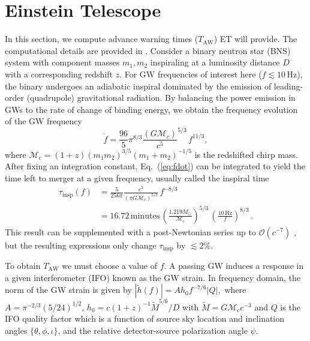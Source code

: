 \documentclass{aa}
\newcommand{\be}{\begin{equation}}
\newcommand{\ee}{\end{equation}}
\newcommand{\f}{\frac}
\newcommand{\nn}{\nonumber}
\newcommand{\ord}{\mathcal{O}}
\newcommand{\M}{\mathcal{M}_c}
\begin{document}
\section{Einstein Telescope}
\label{sect:et}
In this section, we compute advance warning times ($T_\text{AW}$) ET will provide.
The computational details are provided in \cite{Akcay18}.
Consider a binary neutron star (BNS) system with component masses
$m_1, m_2$ inspiraling at a luminosity distance $D$ with a corresponding redshift $z$. For GW frequencies of interest here ($f \lesssim 10\,$Hz), the binary undergoes an adiabatic inspiral dominated by
the emission of leading-order (quadrupole)
gravitational radiation. By balancing the
power emission in GWs to the rate of change of binding energy, we obtain the frequency evolution of the GW frequency
%
\be
\dot{f} = \f{96}{5}\pi^{8/3} \f{(G \mathcal{M}_c)}{c^5}^{5/3}\, f^{11/3}, \label{eq:fdot}
\ee
where $\mathcal{M}_c  = (1+z){(m_1 m_2)^{3/5}}{(m_1+m_2)^{-1/5}}$ is the redshifted chirp mass. 
After fixing an integration constant, Eq.~(\ref{eq:fdot})
can be integrated to yield the time left to merger at a given frequency, usually called the inspiral time
%
\begin{align}
\tau_\text{insp}(f) &= \f{5}{256\pi}\f{c^5}{(\pi G \M)^{5/3}} \,f^{-8/3}\nn\\
&=16.72\,\text{minutes} \, \left(\f{1.219 M_\odot}{\M}\right)^{5/3}\,\left(\f{10\,\text{Hz}}{f}\right)^{8/3}
\label{eq:tau_insp}\, .
\end{align}
%
This result can be supplemented with a post-Newtonian series up to $\ord(c^{-7})$ \citep{Blanchet_LRR}, but the resulting expressions
 only change $\tau_\text{insp}$ by $\lesssim 2\%$.

To obtain $T_\text{AW}$ we must choose a value of $f$.
A passing GW induces a response in a given interferometer (IFO) known as the GW strain. %
In frequency domain, the norm of the GW strain is given by
%
$|\tilde{h}(f)|=A h_0 f^{-7/6} |Q|,$ %
%
where $A= \pi^{-2/3}(5/24)^{1/2},\, h_0 = c  (1+z)^{-1}\tilde{M}^{5/6}/D$ with $\tilde{M}= G \M c^{-3}$ and $Q$ is the IFO quality factor which is a function of source sky location and inclination angles $\{\theta,\phi, \iota\}$, and the relative detector-source polarization angle $\psi$.
\end{document}
